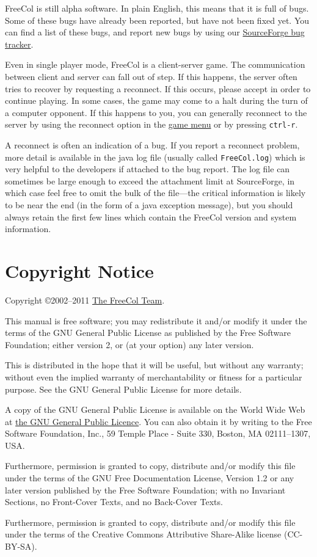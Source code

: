 \documentclass[12pt]{book}
\begin{document}
FreeCol is still alpha software. In plain English, this means that it
is full of bugs. Some of these bugs have already been reported, but
have not been fixed yet. You can find a list of these bugs, and report
new bugs by using our
\href{http://sourceforge.net/tracker/?group_id=43225&atid=435578}{SourceForge
bug tracker}.

Even in single player mode, FreeCol is a client-server game. The
communication between client and server can fall out of step. If this
happens, the server often tries to recover by requesting a
reconnect. If this occurs, please accept in order to continue
playing. In some cases, the game may come to a halt during the turn of
a computer opponent. If this happens to you, you can generally
reconnect to the server by using the reconnect option in the
\hyperlink{game menu}{game menu} or by pressing \verb$ctrl-r$.

A reconnect is often an indication of a bug.  If you report a
reconnect problem, more detail is available in the java log file
(usually called \texttt{FreeCol.log}) which is very helpful to the
developers if attached to the bug report.  The log file can sometimes
be large enough to exceed the attachment limit at SourceForge, in
which case feel free to omit the bulk of the file---the critical
information is likely to be near the end (in the form of a
java exception message), but you should always retain the first few
lines which contain the FreeCol version and system information.


\hypertarget{Copyright Notice}{\chapter{Copyright Notice}}

Copyright \copyright 2002--2011
\href{http://freecol.sourceforge.net/index.php?section=8}{The FreeCol
Team}.

This manual is free software; you may redistribute it and/or modify it
under the terms of the GNU General Public License as published by the
Free Software Foundation; either version 2, or (at your option) any
later version.

This is distributed in the hope that it will be useful, but without
any warranty; without even the implied warranty of merchantability or
fitness for a particular purpose. See the GNU General Public License
for more details.

A copy of the GNU General Public License is available on the World
Wide Web at \href{http://www.gnu.org/copyleft/gpl.html}{the GNU
General Public Licence}. You can also obtain it by writing to the Free
Software Foundation, Inc., 59 Temple Place - Suite 330, Boston, MA
02111--1307, USA.


Furthermore, permission is granted to copy, distribute and/or modify
this file under the terms of the GNU Free Documentation License,
Version 1.2 or any later version published by the Free Software
Foundation; with no Invariant Sections, no Front-Cover Texts, and no
Back-Cover Texts.

Furthermore, permission is granted to copy, distribute and/or modify
this file under the terms of the Creative Commons Attributive
Share-Alike license (CC-BY-SA).


\printindex
\end{document}
